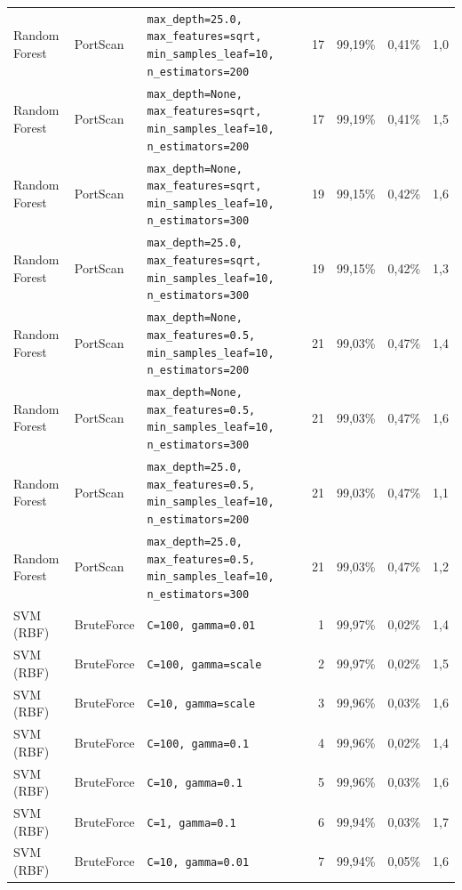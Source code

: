 {{\begin{tabularx}{\textwidth}{@{}llLrrrr@{}}
Random Forest & PortScan & \scriptsize\texttt{max\_depth=25.0, max\_features=sqrt, min\_samples\_leaf=10, n\_estimators=200} & 17 & 99,19\% & 0,41\% & 1,0\\
Random Forest & PortScan & \scriptsize\texttt{max\_depth=None, max\_features=sqrt, min\_samples\_leaf=10, n\_estimators=200} & 17 & 99,19\% & 0,41\% & 1,5\\
Random Forest & PortScan & \scriptsize\texttt{max\_depth=None, max\_features=sqrt, min\_samples\_leaf=10, n\_estimators=300} & 19 & 99,15\% & 0,42\% & 1,6\\
Random Forest & PortScan & \scriptsize\texttt{max\_depth=25.0, max\_features=sqrt, min\_samples\_leaf=10, n\_estimators=300} & 19 & 99,15\% & 0,42\% & 1,3\\
Random Forest & PortScan & \scriptsize\texttt{max\_depth=None, max\_features=0.5, min\_samples\_leaf=10, n\_estimators=200} & 21 & 99,03\% & 0,47\% & 1,4\\
Random Forest & PortScan & \scriptsize\texttt{max\_depth=None, max\_features=0.5, min\_samples\_leaf=10, n\_estimators=300} & 21 & 99,03\% & 0,47\% & 1,6\\
Random Forest & PortScan & \scriptsize\texttt{max\_depth=25.0, max\_features=0.5, min\_samples\_leaf=10, n\_estimators=200} & 21 & 99,03\% & 0,47\% & 1,1\\
Random Forest & PortScan & \scriptsize\texttt{max\_depth=25.0, max\_features=0.5, min\_samples\_leaf=10, n\_estimators=300} & 21 & 99,03\% & 0,47\% & 1,2\\
SVM (RBF) & BruteForce & \scriptsize\texttt{C=100, gamma=0.01} & 1 & 99,97\% & 0,02\% & 1,4\\
SVM (RBF) & BruteForce & \scriptsize\texttt{C=100, gamma=scale} & 2 & 99,97\% & 0,02\% & 1,5\\
SVM (RBF) & BruteForce & \scriptsize\texttt{C=10, gamma=scale} & 3 & 99,96\% & 0,03\% & 1,6\\
SVM (RBF) & BruteForce & \scriptsize\texttt{C=100, gamma=0.1} & 4 & 99,96\% & 0,02\% & 1,4\\
SVM (RBF) & BruteForce & \scriptsize\texttt{C=10, gamma=0.1} & 5 & 99,96\% & 0,03\% & 1,6\\
SVM (RBF) & BruteForce & \scriptsize\texttt{C=1, gamma=0.1} & 6 & 99,94\% & 0,03\% & 1,7\\
SVM (RBF) & BruteForce & \scriptsize\texttt{C=10, gamma=0.01} & 7 & 99,94\% & 0,05\% & 1,6\\

\end{tabularx}}}
